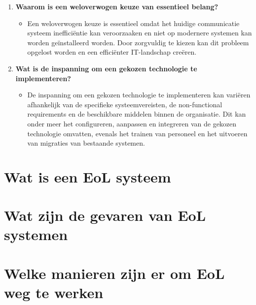 \begin{enumerate}

\item \textbf{Waarom is een weloverwogen keuze van essentieel belang?}
  \begin{itemize}
      \item Een weloverwogen keuze is essentieel omdat het huidige communicatie systeem inefficiëntie kan veroorzaaken en niet op modernere systemen 
      kan worden geïnstalleerd worden. Door zorgvuldig te kiezen kan dit probleem opgelost worden en een 
      efficiënter IT-landschap creëren.
  \end{itemize}

\item \textbf{Wat is de inspanning om een gekozen technologie te implementeren?}
  \begin{itemize}
      \item De inspanning om een gekozen technologie te implementeren kan variëren afhankelijk van de specifieke systeemvereisten, 
      de non-functional requirements en de beschikbare middelen binnen de organisatie. Dit kan onder meer het configureren, 
      aanpassen en integreren van de gekozen technologie omvatten, evenals het trainen van personeel en het uitvoeren van migraties van 
      bestaande systemen.
  \end{itemize}
\end{enumerate}



\section{Wat is een EoL systeem}

\section{Wat zijn de gevaren van EoL systemen}

\section{Welke manieren zijn er om EoL weg te werken}


